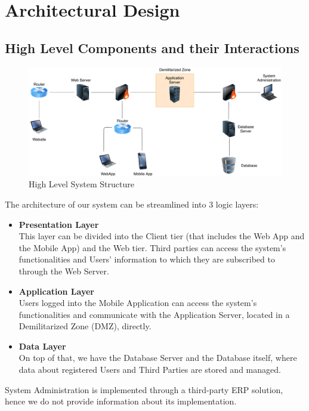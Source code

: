 \documentclass[12pt,a4paper]{article}
\begin{document}
\section{Architectural Design}
	\subsection{High Level Components and their Interactions}
	\begin{figure}[h]
		\centering
		\includegraphics[height=0.5\linewidth]{images/high_level_diag}
		\caption{High Level System Structure}
		\label{fig:highleveldiag} 
	\end{figure}


The architecture of our system can be streamlined into 3 logic layers:
	\begin{itemize}
		\item \textbf{Presentation Layer}\\ 
		This layer can be divided into the Client tier (that includes the Web App and the Mobile App) and the Web tier. Third parties can access the system's functionalities and Users' information to which they are subscribed to through the Web Server. 
		\item \textbf{Application Layer}\\
		Users logged into the Mobile Application can access the system's functionalities and communicate with the Application Server, located in a Demilitarized Zone (DMZ), directly.
		\item \textbf{Data Layer}\\
		On top of that, we have the Database Server and the Database itself, where data about registered Users and Third Parties are stored and managed.
	\end{itemize}
	System Administration is implemented through a third-party ERP solution, hence we do not provide information about its implementation.
	
\end{document}
